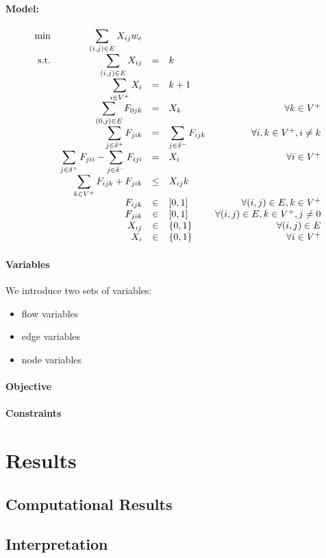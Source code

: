 \documentclass{article}
\begin{document}
\paragraph{Model:}
\newcommand{\vkflow}{F_{ijk}}
\newcommand{\vkflowrev}{F_{jik}}
\newcommand{\ksum}{\displaystyle \sum_{k \in V^+}}
\begin{equation}
\begin{array}{r r c l r}
\displaystyle \min & \edgesum {\vedge w_e} \\
\textrm{s.t.}  

& \edgesum \vedge & = & k & \\
& \nodesum \vnode & = & k + 1 & \\
& \displaystyle \sum_{(0, j) \in E} F_{0jk} & = & X_k & \forall k \in V^+ \\

& \displaystyle \sum_{j \in \delta^+} F_{jik} & = & \displaystyle \sum_{j \in \delta^-} F_{ijk} & \forall i, k \in V^+, i \neq k \\
& \displaystyle \sum_{j \in \delta^+} F_{jii} - \displaystyle \sum_{j \in \delta^-} F_{iji}& = & \vnode & \forall i \in V^+ \\

& \ksum F_{ijk} + F_{jik} & \leq & \vedge k & \\

& \vkflow & \in & [0, 1]  &  \forall (i,j) \in E, k \in V^+\\
&\vkflowrev & \in & [0, 1]  &  \forall (i,j) \in E, k \in V^+, j \neq 0\\
& \vedge & \in & \binaries  &  \forall (i,j) \in E\\
& \vnode & \in & \binaries  &  \forall i \in V^+\\

\end{array}
\end{equation}
\paragraph{Variables} We introduce two sets of variables:
\begin{itemize}
	\item flow variables
	\item edge variables
	\item node variables
\end{itemize}

\paragraph{Objective} 
\paragraph{Constraints}

\section{Results}

\subsection{Computational Results}

\subsection{Interpretation}
\end{document}
